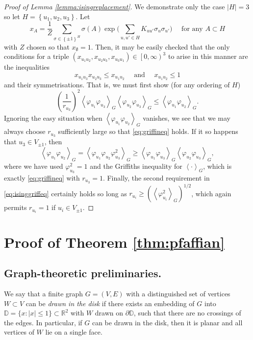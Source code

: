 \documentclass{article}
\numberwithin{equation}{section}
\theoremstyle{definition}
\theoremstyle{definition}
\theoremstyle{remark}
\newcommand{\RR}{\mathbb{R}}
\newcommand\vp{\varphi}
\newcommand{\Vis}{V_{\mathrm{Ising}}}
\renewcommand{\Vis}{V_{\pm 1}}
\begin{document}
\begin{proof}[Proof of Lemma \ref{lemma:isingreplacement}]
	We demonstrate only the case $|H| = 3$ so let $H = \left\{ u_1,u_2,u_3 \right\}$. Let 
	\[
	x_A = \frac{1}{Z}\sum_{ \sigma \in \left\{ \pm 1 \right\}^H} \sigma(A) \exp\Big( \sum_{u,u' \in H} K_{uu'} \sigma_u \sigma_{u'} \Big) \quad \text{ for any $A \subset H$}
	\]
	with $Z$ chosen so that $x_{\emptyset} = 1$. Then, it may be easily checked that the only conditions for a triple $(x_{u_1u_2},x_{u_2u_3},x_{u_3u_1}) \in \left[ 0,\infty \right)^3$ to arise in this manner are the inequalities 
	\begin{equation}\label{eq:isinggriffeq}
		x_{u_1u_3} x_{u_2u_3}\leq x_{u_1 u_2} \quad \text{ and } \quad x_{u_1 u_2} \leq 1
	\end{equation} 
	and their symmetrisations. 
	That is, we must first show (for any ordering of $H$)
	\begin{equation}\label{eq:griffineq}
		\left( \frac{1}{r_{u_3}} \right)^2 \left< \vp_{u_1}\vp_{u_3} \right>_{G} \left< \vp_{u_2} \vp_{u_3} \right>_{G} \leq \left< \vp_{u_1} \vp_{u_2} \right>_{G}.
	\end{equation} 
	Ignoring the easy situation when $\left< \vp_{u_1} \vp_{u_2} \right>_{G}$ vanishes, we see that we may always choose $r_{u_3}$ sufficiently large so that \eqref{eq:griffineq} holds. If it so happens that $u_3 \in \Vis$, then
	\[
		\left< \vp_{u_1} \vp_{u_2} \right>_{G} = \left< \vp_{u_1} \vp_{u_2} \vp_{u_3}^2 \right>_{G} \geq \left< \vp_{u_1}\vp_{u_3} \right>_{G} \left< \vp_{u_2} \vp_{u_3} \right>_{G},
	\] 
	where we have used $\vp_{u_3}^2 = 1$ and the Griffiths inequality for $\left< \cdot \right>_{G}$, which is exactly \eqref{eq:griffineq} with $r_{u_3} = 1$.
	Finally, the second requirement in \eqref{eq:isinggriffeq} certainly holds so long as $r_{u_i} \geq ( \left< \vp_{u_i}^2 \right>_{G})^{1 / 2}$, which again permits $r_{u_i} = 1$ if $u_i \in \Vis$.
\end{proof}

\section{Proof of Theorem \ref{thm:pfaffian}}\label{sec:proof1}

\subsection{Graph-theoretic preliminaries. }We say that a finite graph $G = (V, E)$ with a distinguished set of vertices $W \subset V$ can be 
\emph{drawn in the disk}
if there exists an embedding of $G$ into $\mathbb{D} = \{x: |x| \leq 1\} \subset \RR^2$ with $W$ drawn on $\partial \mathbb{D}$, 
such that there are no crossings of the edges. 
In particular, if $G$ can be drawn in the disk, then it is planar and all vertices of $W$ lie on a single face. 
\end{document}
